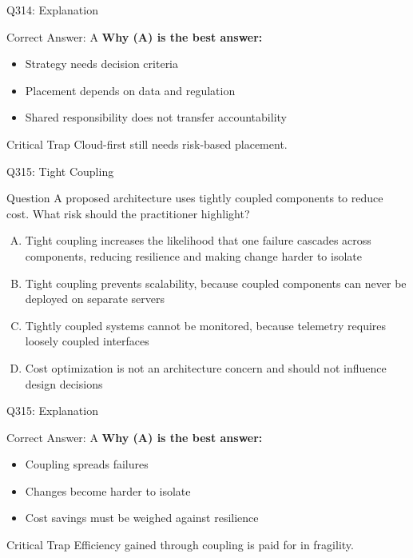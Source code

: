 \documentclass{beamer}
\begin{document}
	\begin{frame}{Q314: Explanation}
		\begin{block}{Correct Answer: A}
			\textbf{Why (A) is the best answer:}
			\begin{itemize}
				\item Strategy needs decision criteria
				\item Placement depends on data and regulation
				\item Shared responsibility does not transfer accountability
			\end{itemize}
		\end{block}
		\begin{alertblock}{Critical Trap}
			Cloud-first still needs risk-based placement.
		\end{alertblock}
	\end{frame}
	
	\begin{frame}{Q315: Tight Coupling}
		\begin{block}{Question}
			\small A proposed architecture uses tightly coupled components to reduce cost. What risk should the practitioner highlight?
		\end{block}
		\begin{enumerate}[(A)]
			\footnotesize
			\item Tight coupling increases the likelihood that one failure cascades across components, reducing resilience and making change harder to isolate
			\item Tight coupling prevents scalability, because coupled components can never be deployed on separate servers
			\item Tightly coupled systems cannot be monitored, because telemetry requires loosely coupled interfaces
			\item Cost optimization is not an architecture concern and should not influence design decisions
		\end{enumerate}
	\end{frame}
	
	\begin{frame}{Q315: Explanation}
		\begin{block}{Correct Answer: A}
			\textbf{Why (A) is the best answer:}
			\begin{itemize}
				\item Coupling spreads failures
				\item Changes become harder to isolate
				\item Cost savings must be weighed against resilience
			\end{itemize}
		\end{block}
		\begin{alertblock}{Critical Trap}
			Efficiency gained through coupling is paid for in fragility.
		\end{alertblock}
	\end{frame}
	
\end{document}
